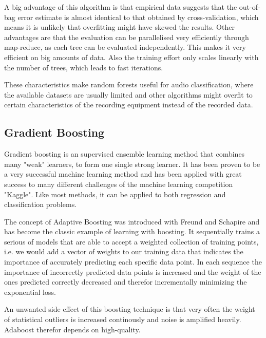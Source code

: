 A big advantage of this algorithm is that empirical data suggests that the out-of-bag error estimate is almost identical to that obtained by cross-validation, which means it is unlikely that overfitting might have skewed the results. Other advantages are that the evaluation can be parallelised very efficiently through map-reduce, as each tree can be evaluated independently. This makes it very efficient on big amounts of data. Also the training effort only scales linearly with the number of trees, which leads to fast iterations.

These characteristics make random forests useful for audio classification, where the available datasets are usually limited and other algorithms might overfit to certain characteristics of the recording equipment instead of the recorded data.






\subsection{Gradient Boosting}

Gradient boosting is an supervised ensemble learning method that combines many "weak" learners, to form one single strong learner.  It has been proven to be a very successful machine learning method and has been applied with great success to many different challenges of the machine learning competition "Kaggle". Like most methods, it can be applied to both regression and classification problems.

The concept of Adaptive Boosting was introduced with \cite{Freund97adecision-theoretic} Freund and Schapire and has become the classic example of learning with boosting. It sequentially trains a serious of models that are able to accept a weighted collection of training points, i.e. we would add a vector of weights to our training data that indicates the importance of accurately predicting each specific data point. In each sequence the importance of incorrectly predicted data points is increased and the weight of the ones predicted correctly decreased and therefor incrementally minimizing the exponential loss.

An unwanted side effect of this boosting technique is that very often the weight of statistical outliers is increased continously and noise is amplified heavily. Adaboost therefor depends on high-quality. %

